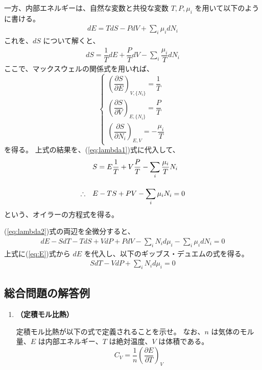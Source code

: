\documentclass[uplatex,dvipdfmx,a4paper,11pt]{jsarticle}
\begin{document}
\begin{appendix}
\begin{enumerate}
一方、内部エネルギーは、自然な変数と共役な変数 $T, P, \mu_i$ を用いて以下のように書ける。
\begin{align}
dE = T dS -P dV + \sum_i \mu_i d N_i
\label{eq:E}
\end{align}
これを、$dS$ について解くと、
\begin{align*}
dS = \dfrac{1}{T}dE  +\dfrac{P}{T} dV - \sum_i \dfrac{\mu_i}{T} d N_i
\end{align*}
ここで、マックスウェルの関係式を用いれば、
\begin{equation*}
\begin{cases}
\left(\dfrac{\partial S}{\partial E} \right)_{V, \{N_i\}} = \dfrac{1}{T} \\[10pt]
\left(\dfrac{\partial S}{\partial V} \right)_{E, \{N_i\}} = \dfrac{P}{T} \\[10pt]
\left(\dfrac{\partial S}{\partial N_i} \right)_{E, V} = -\dfrac{\mu_i}{T}
\end{cases}
\end{equation*}
を得る。
上式の結果を、(\ref{eq:lambda1})式に代入して、
\begin{align}
&S = E\dfrac{1}{T} + V\dfrac{P}{T} - \sum_i \dfrac{\mu_i}{T} N_i \notag \\[10pt]
\therefore \quad &E -TS + PV - \sum_i \mu_i N_i = 0
\label{eq:lambda2}
\end{align}
という、オイラーの方程式を得る。

(\ref{eq:lambda2})式の両辺を全微分すると、
\begin{align}
dE -SdT -TdS+ VdP + PdV - \sum_i N_i d\mu_i - \sum_i \mu_i dN_i = 0
\label{eq:lambda3}
\end{align}
上式に(\ref{eq:E})式から $dE$ を代入し、以下のギッブス・デュエムの式を得る。
\begin{align}
SdT -VdP+ \sum_i N_i d\mu_i = 0
\end{align}

\end{enumerate}

\newpage

\subsection{総合問題の解答例}

\begin{enumerate}
\item 
{\bf （定積モル比熱）}

定積モル比熱が以下の式で定義されることを示せ。
なお、$n$ は気体のモル量、$E$ は内部エネルギー、$T$ は絶対温度、$V$ は体積である。
\begin{equation*}
C_V = \dfrac{1}{n} \left( \dfrac{\partial E}{\partial T} \right)_V
\end{equation*}


\end{enumerate}
\end{appendix}
\end{document}
